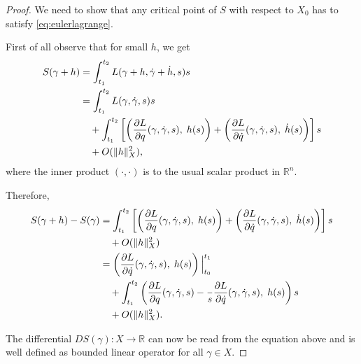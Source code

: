 \documentclass[english,fontsize=11pt,paper=a5,oneside]{scrbook}
\newcommand{\R}{\mathbb{R}}
\let\d\relax
\DeclareMathOperator{\d}{d}
\theoremstyle{definition}
\begin{document}
\begin{proof}
    We need to show that any critical point of $S$ with respect to $X_0$ has to satisfy \eqref{eq:eulerlagrange}.

    First of all observe that for small $h$, we get
    \begin{equation}
        \begin{split}
            S(\gamma + h) &= \int_{t_1}^{t_2} L(\gamma + h, \dot \gamma + \dot h, s) \d s \\
            &= \int_{t_1}^{t_2} 
                L(\gamma, \dot \gamma, s) \d s \\
            &\quad + \int_{t_1}^{t_2} \left[
                \left(
                    \frac{\partial L}{\partial q}(\gamma, \dot \gamma, s),\;
                    h(s)
                \right)
                + \left(
                    \frac{\partial L}{\partial \dot q}(\gamma, \dot \gamma, s),\;
                    \dot h(s)
                \right)
            \right] \d s \\
            &\quad + O(\|h\|^2_X),
        \end{split}
    \end{equation}
    where the inner product $(\cdot,\cdot)$ is to the usual scalar product in $\R^n$.

    Therefore,
    \begin{equation}
        \begin{split}
            S(\gamma+h) - S(\gamma) &= \int_{t_1}^{t_2} \left[
                \left(\frac{\partial L}{\partial q}(\gamma, \dot \gamma, s),\; h(s)\right)
                + \left(\frac{\partial L}{\partial \dot q}(\gamma, \dot \gamma, s),\; \dot h(s)\right)
            \right] \d s\\
            &\quad + O(\|h\|^2_X)\\
            &= \left(\frac{\partial L}{\partial \dot q}(\gamma, \dot \gamma, s),\; h(s)\right) \Big|_{t_0}^{t_1} \\
            &\quad + \int_{t_1}^{t_2} \left(
                \frac{\partial L}{\partial q}(\gamma, \dot \gamma, s)
                - \frac{\d}{\d s}\frac{\partial L}{\partial \dot q}(\gamma, \dot \gamma, s)
            ,\; h(s)\right) \d s\\
            &\quad + O(\|h\|^2_X).
        \end{split}
    \end{equation}

    The differential $DS(\gamma): X \to \R$ can now be read from the equation above and is well defined as bounded linear operator for all $\gamma\in X$.


\end{proof}
\end{document}
